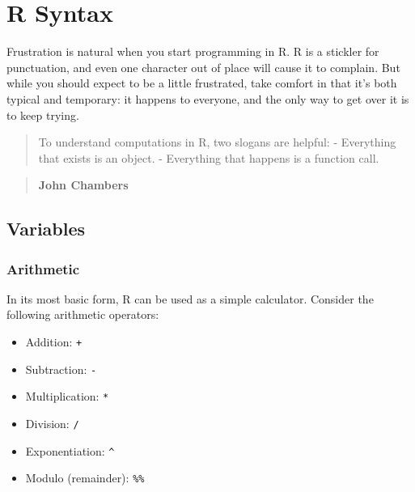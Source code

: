 \documentclass[]{book}
\newenvironment{Shaded}{\begin{snugshade}}{\end{snugshade}}
\newcommand{\DecValTok}[1]{\textcolor[rgb]{0.00,0.00,0.81}{#1}}
\newcommand{\StringTok}[1]{\textcolor[rgb]{0.31,0.60,0.02}{#1}}
\newcommand{\CommentTok}[1]{\textcolor[rgb]{0.56,0.35,0.01}{\textit{#1}}}
\newcommand{\OperatorTok}[1]{\textcolor[rgb]{0.81,0.36,0.00}{\textbf{#1}}}
\newcommand{\NormalTok}[1]{#1}
\providecommand{\tightlist}{%
  \setlength{\itemsep}{0pt}\setlength{\parskip}{0pt}}
\begin{document}
\chapter{R Syntax}\label{r-syntax}

Frustration is natural when you start programming in R. R is a stickler
for punctuation, and even one character out of place will cause it to
complain. But while you should expect to be a little frustrated, take
comfort in that it's both typical and temporary: it happens to everyone,
and the only way to get over it is to keep trying.

\begin{quote}
To understand computations in R, two slogans are helpful: - Everything
that exists is an object. - Everything that happens is a function call.
\end{quote}

\begin{quote}
\textbf{John Chambers}
\end{quote}

\section{Variables}\label{variables}

\subsection{Arithmetic}\label{arithmetic}

In its most basic form, R can be used as a simple calculator. Consider
the following arithmetic operators:

\begin{itemize}
\tightlist
\item
  Addition: \texttt{+}
\item
  Subtraction: \texttt{-}
\item
  Multiplication: \texttt{*}
\item
  Division: \texttt{/}
\item
  Exponentiation: \texttt{\^{}}
\item
  Modulo (remainder): \texttt{\%\%}
\end{itemize}

\begin{Shaded}
\end{Shaded}
\end{document}
